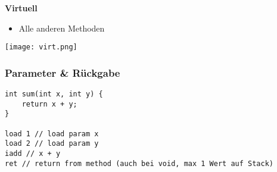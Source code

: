 \textbf{Virtuell}
\begin{itemize}
    \item Alle anderen Methoden
\end{itemize}
\texttt{[image: virt.png]}

\subsubsection{Parameter \& Rückgabe}
\begin{lstlisting}
int sum(int x, int y) {
    return x + y;
}

load 1 // load param x
load 2 // load param y
iadd // x + y
ret // return from method (auch bei void, max 1 Wert auf Stack)
\end{lstlisting}